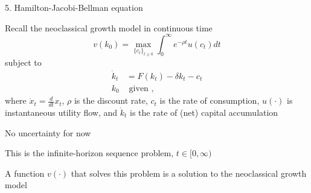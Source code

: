 \documentclass[11pt, aspectratio=169]{beamer}
\newenvironment{witemize}{\itemize\addtolength{\itemsep}{10pt}}{\enditemize}
\begin{document}
\begin{frame}{5. Hamilton-Jacobi-Bellman equation}
\begin{witemize}
\item Recall the neoclassical growth model in continuous time
\begin{equation*}
	v(k_0) = \max_{\{ c_t \}_{t \geq 0} } \int_0^\infty e^{-\rho t} u(c_t) dt
\end{equation*}
subject to
\begin{align*}
	\dot k_t &= F(k_t) - \delta k_t - c_t \\
	k_0 &\text{ given },
\end{align*}
where $\dot x_t = \frac{d}{dt} x_t$, $\rho$ is the discount rate, $c_t$ is the rate of consumption, $u(\cdot)$ is instantaneous utility flow, and $\dot k_t$ is the rate of (net) capital accumulation

\item No uncertainty for now %

\item This is the infinite-horizon sequence problem, $t \in [0, \infty)$

\item A function $v(\cdot)$ that solves this problem is a solution to the neoclassical growth model 
\end{witemize}
\end{frame}
\end{document}

